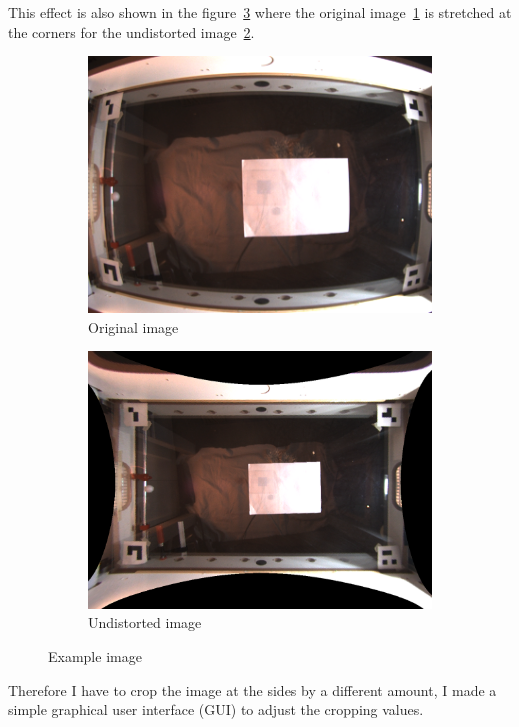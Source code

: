This effect is also shown in the figure~\ref{fig:original_undistorted_example} where the original image~\ref{fig:original_example8} is stretched at the corners for the undistorted image~\ref{fig:undistorted_example8}.
\begin{figure}[H]
    \centering
    \begin{subfigure}{.5\textwidth}
        \centering
        \includegraphics[width=.8\textwidth]{../photos/original_example12}
        \caption[originalRainbow]{Original image}
        \label{fig:original_example8}
    \end{subfigure}%
    \begin{subfigure}{.5\textwidth}
        \centering
        \includegraphics[width=.8\textwidth]{../photos/output12}
        \caption[originalRainbow]{Undistorted image}
        \label{fig:undistorted_example8}
    \end{subfigure}
    \caption{Example image}
    \label{fig:original_undistorted_example}
\end{figure}
Therefore I have to crop the image at the sides by a different amount, I made a simple graphical user interface (GUI) to adjust the cropping values.
